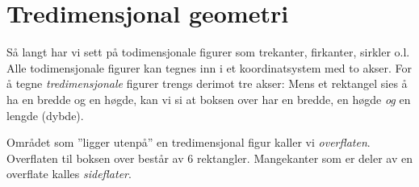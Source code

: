 \newpage
{}

\section{Tredimensjonal geometri}
Så langt har vi sett på todimensjonale figurer som trekanter, firkanter, sirkler o.l. Alle todimensjonale figurer kan tegnes inn i et koordinatsystem med to akser.
For å tegne \textit{tredimensjonale} figurer trengs derimot tre akser:
Mens et rektangel sies å ha en bredde og en høgde, kan vi si at boksen over har en bredde, en høgde \textsl{og} en lengde (dybde). \vsk

Området som ''ligger utenpå'' en tredimensjonal figur kaller vi \textit{overflaten}. Overflaten til boksen over består av 6 rektangler. Mangekanter som er deler av en overflate kalles \textit{sideflater}.

